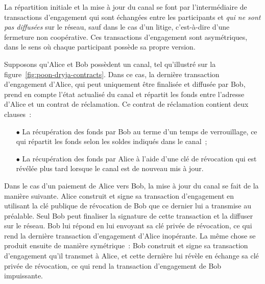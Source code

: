 %
%
%

La répartition initiale et la mise à jour du canal se font par l'intermédiaire de transactions d'engagement qui sont échangées entre les participants et \emph{qui ne sont pas diffusées} sur le réseau, sauf dans le cas d'un litige, c'est-à-dire d'une fermeture non coopérative. Ces transactions d'engagement sont asymétriques, dans le sens où chaque participant possède sa propre version.

Supposons qu'Alice et Bob possèdent un canal, tel qu'illustré sur la figure~\ref{fig:poon-dryja-contracts}. Dans ce cas, la dernière transaction d'engagement d'Alice, qui peut uniquement être finalisée et diffusée par Bob, prend en compte l'état actualisé du canal et répartit les fonds entre l'adresse d'Alice et un contrat de réclamation. Ce contrat de réclamation contient deux clauses~:

\begin{itemize}
\item[$\bullet$] La récupération des fonds par Bob au terme d'un temps de verrouillage, ce qui répartit les fonds selon les soldes indiqués dans le canal~;
\item[$\bullet$] La récupération des fonds par Alice à l'aide d'une clé de révocation qui est révélée plus tard lorsque le canal est de nouveau mis à jour.
\end{itemize}

Dans le cas d'un paiement de Alice vers Bob, la mise à jour du canal se fait de la manière suivante. Alice construit et signe sa transaction d'engagement en utilisant la clé publique de révocation de Bob que ce dernier lui a transmise au préalable. Seul Bob peut finaliser la signature de cette transaction et la diffuser sur le réseau. Bob lui répond en lui envoyant sa clé privée de révocation, ce qui rend la dernière transaction d'engagement d'Alice inopérante. La même chose se produit ensuite de manière symétrique~: Bob construit et signe sa transaction d'engagement qu'il transmet à Alice, et cette dernière lui révèle en échange sa clé privée de révocation, ce qui rend la transaction d'engagement de Bob impuissante.

